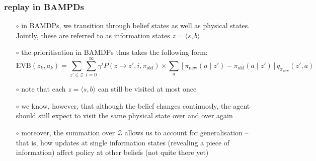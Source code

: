 \documentclass[aspectratio=169]{beamer}
\newcommand{\old}{\text{old}}
\newcommand{\new}{\text{new}}
\begin{document}
\begin{frame}
    \frametitle{replay in BAMPDs}
    \begin{itemize}
        \item[$\circ$] in BAMDPs, we transition through belief states as well as physical states. Jointly, these are referred to as information states $z=\langle s, b\rangle$
        \item[$\circ$] the prioritisation in BAMDPs thus takes the following form:
        $$\text{EVB}(z_k, a_k) = \sum_{z'\in \mathcal{Z}}\sum_{i=0}^{\infty}\gamma^iP(z\rightarrow z', i, \pi_\old)\times \sum_a[\pi_\new(a\mid z') - \pi_\old(a\mid z')]q_{\pi_\new}(z', a)$$  
        \item[$\circ$] note that each $z=\langle s, b\rangle$ can still be visited at most once
        \item[$\circ$] we know, however, that although the belief changes continuosly, the agent should still expect to visit the same physical state over and over again
        \item[$\circ$] moreover, the summation over $\mathcal{Z}$ allows us to account for generalisation -- that is, how updates at single information states (revealing a piece of information) affect policy at other beliefs (not quite there yet)
    \end{itemize}
\end{frame}
\end{document}
